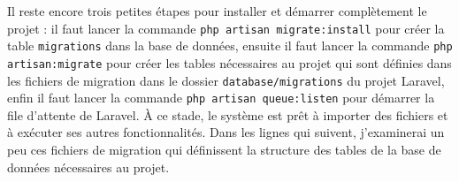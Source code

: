 Il reste encore trois petites étapes pour installer et démarrer complètement le projet : il faut lancer la commande \Verb|php artisan migrate:install| pour créer la table \Verb|migrations| dans la base de données, ensuite il faut lancer la commande \Verb|php artisan:migrate| pour créer les tables nécessaires au projet qui sont définies dans les fichiers de migration dans le dossier \Verb|database/migrations| du projet Laravel, enfin il faut lancer la commande \Verb|php artisan queue:listen| pour démarrer la file d'attente de Laravel. À ce stade, le système est prêt à importer des fichiers et à exécuter ses autres fonctionnalités. Dans les lignes qui suivent, j'examinerai un peu ces fichiers de migration qui définissent la structure des tables de la base de données nécessaires au projet.